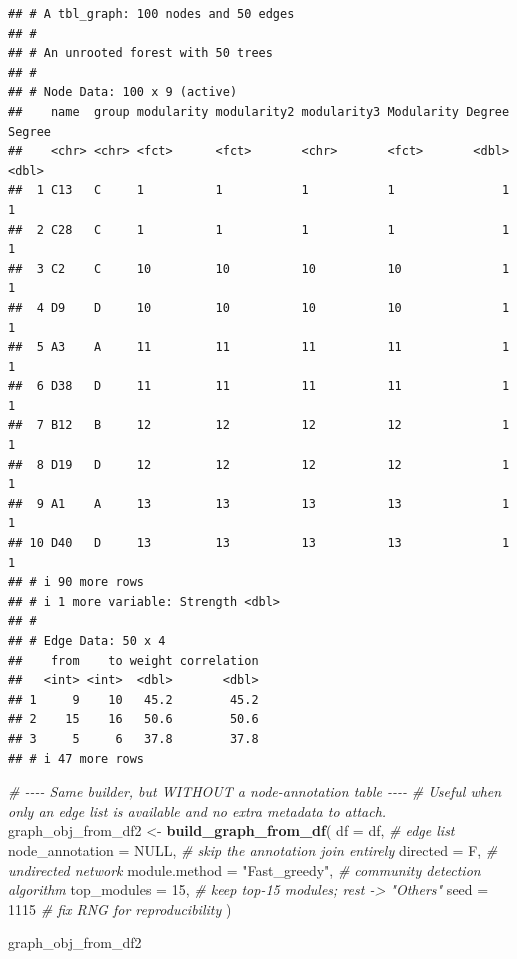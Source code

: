 \documentclass[
]{book}
\newenvironment{Shaded}{\begin{snugshade}}{\end{snugshade}}
\newcommand{\AttributeTok}[1]{\textcolor[rgb]{0.13,0.29,0.53}{#1}}
\newcommand{\CommentTok}[1]{\textcolor[rgb]{0.56,0.35,0.01}{\textit{#1}}}
\newcommand{\ConstantTok}[1]{\textcolor[rgb]{0.56,0.35,0.01}{#1}}
\newcommand{\DecValTok}[1]{\textcolor[rgb]{0.00,0.00,0.81}{#1}}
\newcommand{\FunctionTok}[1]{\textcolor[rgb]{0.13,0.29,0.53}{\textbf{#1}}}
\newcommand{\NormalTok}[1]{#1}
\newcommand{\OtherTok}[1]{\textcolor[rgb]{0.56,0.35,0.01}{#1}}
\newcommand{\StringTok}[1]{\textcolor[rgb]{0.31,0.60,0.02}{#1}}
\begin{document}
\begin{verbatim}
## # A tbl_graph: 100 nodes and 50 edges
## #
## # An unrooted forest with 50 trees
## #
## # Node Data: 100 x 9 (active)
##    name  group modularity modularity2 modularity3 Modularity Degree Segree
##    <chr> <chr> <fct>      <fct>       <chr>       <fct>       <dbl>  <dbl>
##  1 C13   C     1          1           1           1               1      1
##  2 C28   C     1          1           1           1               1      1
##  3 C2    C     10         10          10          10              1      1
##  4 D9    D     10         10          10          10              1      1
##  5 A3    A     11         11          11          11              1      1
##  6 D38   D     11         11          11          11              1      1
##  7 B12   B     12         12          12          12              1      1
##  8 D19   D     12         12          12          12              1      1
##  9 A1    A     13         13          13          13              1      1
## 10 D40   D     13         13          13          13              1      1
## # i 90 more rows
## # i 1 more variable: Strength <dbl>
## #
## # Edge Data: 50 x 4
##    from    to weight correlation
##   <int> <int>  <dbl>       <dbl>
## 1     9    10   45.2        45.2
## 2    15    16   50.6        50.6
## 3     5     6   37.8        37.8
## # i 47 more rows
\end{verbatim}

\begin{Shaded}
\begin{Highlighting}[]
\CommentTok{\# {-}{-}{-}{-} Same builder, but WITHOUT a node{-}annotation table {-}{-}{-}{-}}
\CommentTok{\# Useful when only an edge list is available and no extra metadata to attach.}
\NormalTok{graph\_obj\_from\_df2 }\OtherTok{\textless{}{-}} \FunctionTok{build\_graph\_from\_df}\NormalTok{(}
  \AttributeTok{df              =}\NormalTok{ df,                }\CommentTok{\# edge list}
  \AttributeTok{node\_annotation =} \ConstantTok{NULL}\NormalTok{,              }\CommentTok{\# skip the annotation join entirely}
  \AttributeTok{directed        =}\NormalTok{ F,                 }\CommentTok{\# undirected network}
  \AttributeTok{module.method   =} \StringTok{"Fast\_greedy"}\NormalTok{,     }\CommentTok{\# community detection algorithm}
  \AttributeTok{top\_modules     =} \DecValTok{15}\NormalTok{,                }\CommentTok{\# keep top{-}15 modules; rest {-}\textgreater{} "Others"}
  \AttributeTok{seed            =} \DecValTok{1115}               \CommentTok{\# fix RNG for reproducibility}
\NormalTok{)}

\NormalTok{graph\_obj\_from\_df2}
\end{Highlighting}
\end{Shaded}
\end{document}
